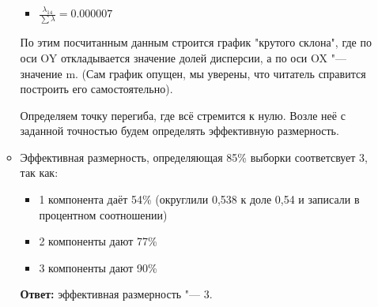 \begin{enumerate}
\begin{itemize}
\begin{itemize}
            \item $\frac{ \lambda_{14} }{\sum \lambda} = 0.000007$
        \end{itemize} \par
        По этим посчитанным данным строится график "крутого склона", где по оси OY откладывается значение долей дисперсии, а по оси OX "--- значение m. (Сам график опущен, мы уверены, что читатель справится построить его самостоятельно). \par
        Определяем точку перегиба, где всё стремится к нулю. Возле неё с заданной точностью будем определять эффективную размерность.
        \item Эффективная размерность, определяющая 85\% выборки соответсвует 3, так как: \par
        \begin{itemize}
            \item 1 компонента даёт 54\% (округлили 0,538 к доле 0,54 и записали в процентном соотношении)
            \item 2 компоненты дают 77\%
            \item 3 компоненты дают 90\%
        \end{itemize}\par
        \textbf{Ответ:} эффективная размерность "--- 3.
    \end{itemize}

\end{enumerate}


